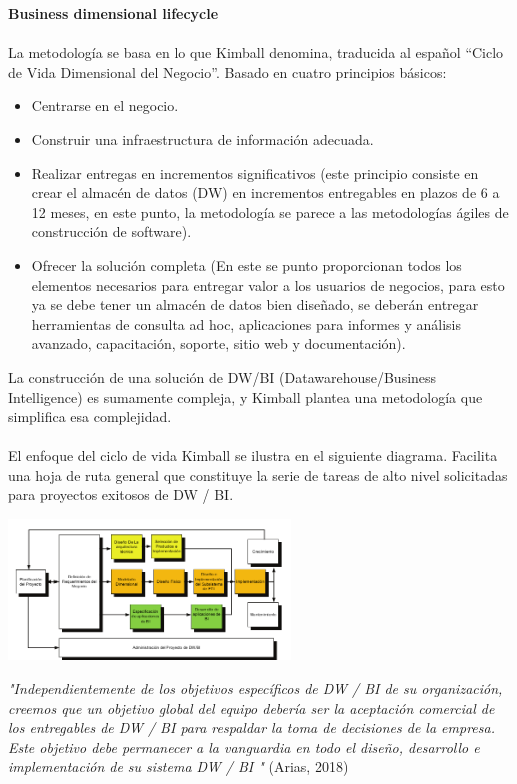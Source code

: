 \documentclass[twoside,twocolumn]{article}
\begin{document}
\begin{enumerate}
\textbf{Business dimensional lifecycle}
\\ \\
La metodología se basa en lo que Kimball denomina, traducida al español “Ciclo de Vida Dimensional del Negocio”. Basado en cuatro principios básicos:

\begin{itemize}
\item Centrarse en el negocio.
\item Construir una infraestructura de información adecuada.
\item Realizar entregas en incrementos significativos (este principio consiste en crear el almacén de datos (DW) en incrementos entregables en plazos de 6 a 12 meses, en este punto, la metodología se parece a las metodologías ágiles de construcción de software).
\item Ofrecer la solución completa (En este se punto proporcionan todos los elementos necesarios para entregar valor a los usuarios de negocios, para esto ya se debe tener un almacén de datos bien diseñado, se deberán entregar herramientas de consulta ad hoc, aplicaciones para informes y análisis avanzado, capacitación, soporte, sitio web y documentación).

\end{itemize}
La construcción de una solución de DW/BI (Datawarehouse/Business Intelligence) es sumamente compleja, y Kimball plantea una metodología que simplifica esa complejidad. \\ \\
El enfoque del ciclo de vida Kimball se ilustra en el siguiente diagrama. Facilita una hoja de ruta general que constituye la serie de tareas de alto nivel solicitadas para proyectos exitosos de DW / BI.


\includegraphics[width=7.5cm]{Imagenes/Kimboll2}

\textit{"Independientemente de los objetivos específicos de DW / BI de su organización, creemos que un objetivo global del equipo debería ser la aceptación comercial de los entregables de DW / BI para respaldar la toma de decisiones de la empresa. Este objetivo debe permanecer a la vanguardia en todo el diseño, desarrollo e implementación de su sistema DW / BI "} (Arias, 2018)
\\ \\



\end{enumerate}
\end{document}
